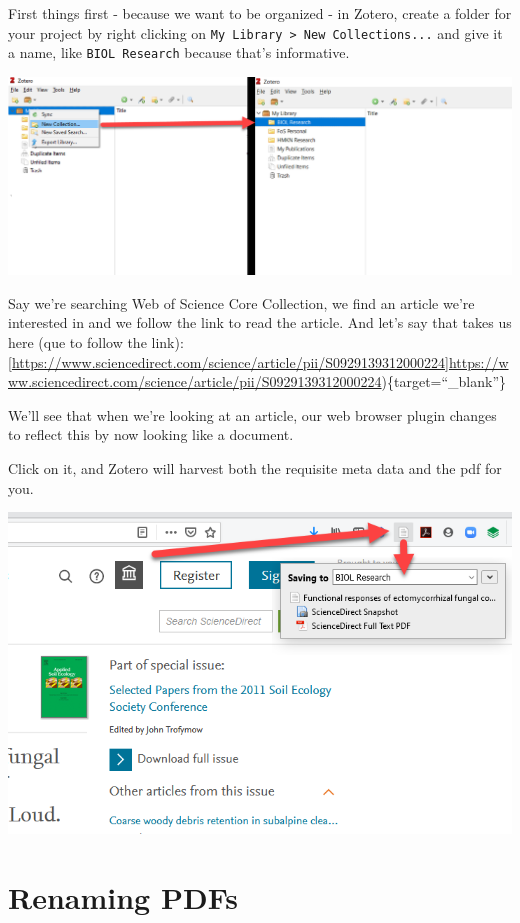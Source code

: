 \documentclass[
]{book}
\begin{document}
First things first - because we want to be organized - in Zotero, create a folder for your project by right clicking on \texttt{My\ Library\ \textgreater{}\ New\ Collections...} and give it a name, like \texttt{BIOL\ Research} because that's informative.

\includegraphics{images/Z_BIOLResearch.png}

Say we're searching Web of Science Core Collection, we find an article we're interested in and we follow the link to read the article. And let's say that takes us here (que to follow the link): {[}\url{https://www.sciencedirect.com/science/article/pii/S0929139312000224}{]}\url{https://www.sciencedirect.com/science/article/pii/S0929139312000224})\{target=``\_blank''\}

We'll see that when we're looking at an article, our web browser plugin changes to reflect this by now looking like a document.

Click on it, and Zotero will harvest both the requisite meta data and the pdf for you.

\includegraphics{images/Z_FirstImport.png}

\hypertarget{renaming-pdfs}{%
\section{Renaming PDFs}\label{renaming-pdfs}}
\end{document}
